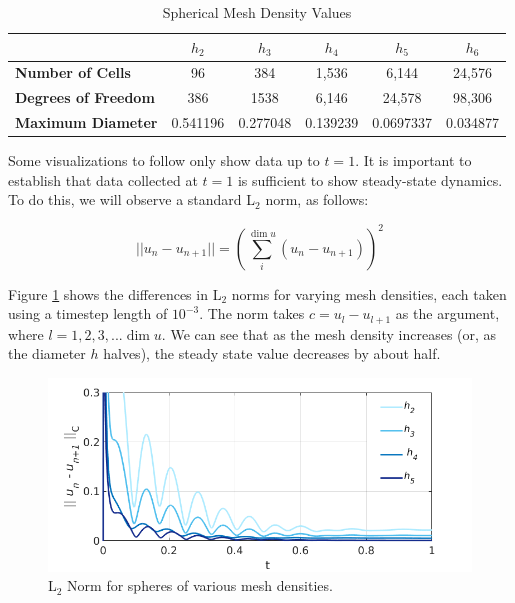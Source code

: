 \documentclass[12pt]{article}
\begin{document}
\begin{table}[H]
	\centering
	\caption{Spherical Mesh Density Values}\label{tab:refine}
	\begin{tabular}{|l|c|c|c|c|c|}
		\hline
		\textbf{}                   & $h_2$    & $h_3$    & $h_4$    & $h_5$     & $h_6$   \\ \hline
		\textbf{Number of Cells}    & 96       & 384      & 1,536    & 6,144     & 24,576\\ \hline
		\textbf{Degrees of Freedom} & 386      & 1538     & 6,146    & 24,578    & 98,306\\ \hline
		\textbf{Maximum Diameter}   & 0.541196 & 0.277048 & 0.139239 & 0.0697337 & 0.034877\\ \hline
	\end{tabular}
\end{table}

Some visualizations to follow only show data up to $t=1$. It is important to establish that data collected at $t=1$ is sufficient to show steady-state dynamics. To do this, we will observe a standard L$_2$ norm, as follows:

\begin{equation}\label{eq:norm_standard}
	||u_n - u_{n+1}|| = \left(\sum_i^{\dim{u}} (u_n - u_{n+1})\right)^2
\end{equation}

Figure \ref{fig:steady-state-h} shows the differences in L$_2$ norms for varying mesh densities, each taken using a timestep length of $10^{-3}$. The norm takes $c=u_l-u_{l+1}$ as the argument, where $l=1,2,3,...\dim{u}$. We can see that as the mesh density increases (or, as the diameter $h$ halves), the steady state value decreases by about half.

\begin{figure}[H]
	\includegraphics[width=\linewidth]{images/norm_numeric.png}
	\caption{L$_2$ Norm for spheres of various mesh densities.}\label{fig:steady-state-h}
\end{figure}
\end{document}

